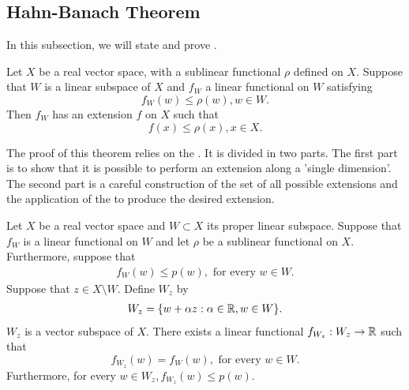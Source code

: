 \subsection{Hahn-Banach Theorem}

In this subsection, we will state and prove .

\begin{theorem}
\label{thm:funct:hahn-banach}
Let $X$ be a real vector space, with a sublinear functional $\rho$ defined on $X$.
Suppose that $W$ is a linear subspace of $X$ and $f_W$ a linear functional on $W$ satisfying
\begin{equation}
    f_W(w) \leq \rho(w), w \in W.
\end{equation}
Then $f_W$ has an extension $f$ on $X$ such that 
\begin{equation}
    f(x) \leq \rho(x), x \in X.
\end{equation}
\end{theorem}
\begin{proof-idea*}
The proof of this theorem relies on the . It is divided in two parts. The first part is to show that it is possible to perform an extension along a 'single dimension'. The second part is a careful construction of the set of all possible extensions and the application of the  to produce the desired extension.
\end{proof-idea*}
\begin{lemma}
\label{lemma:hb:singledimensext}
Let $X$ be a real vector space and $W \subset X$ its proper linear subspace. Suppose that $f_{W}$ is a linear functional on $W$ and let $\rho$ be a sublinear functional on $X$.
Furthermore, suppose that 
\begin{align}
    \label{ineqn:funct:singledimens:ass1}
    f_W(w) \leq p(w), \text{    for every $w \in W$}.
\end{align}
Suppose that $z \in X \setminus W$. Define $W_z$ by
\begin{align*}
    W_z = \{ w + \alpha z : \alpha \in {\mathbb R}, w \in W \}.
\end{align*}
$W_z$ is a vector subspace of $X$. There exists a linear functional $f_{W_z} : W_z \to {\mathbb R}$ such that \[ f_{W_z}(w) = f_W(w), \text{ for every $w \in W$.} \]
Furthermore, for every $w \in W_z, f_{W_z}(w) \leq p(w)$.
\end{lemma}
\clearpage
